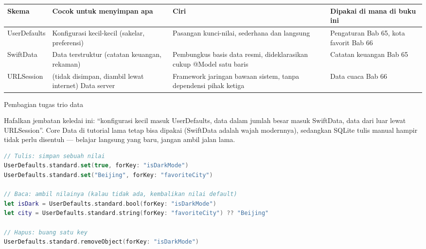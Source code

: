 


\begin{center}
\begin{tabularx}{\linewidth}{|X|X|X|X|}
\hline
\textbf{Skema} & \textbf{Cocok untuk menyimpan apa} & \textbf{Ciri} & \textbf{Dipakai di mana di buku ini} \tabularnewline
\hline
UserDefaults & Konfigurasi kecil-kecil (sakelar, preferensi) & Pasangan kunci-nilai, sederhana dan langsung & Pengaturan Bab 65, kota favorit Bab 66 \tabularnewline
SwiftData & Data terstruktur (catatan keuangan, rekaman) & Pembungkus basis data resmi, dideklarasikan cukup @Model satu baris & Catatan keuangan Bab 65 \tabularnewline
URLSession & (tidak disimpan, diambil lewat internet) Data server & Framework jaringan bawaan sistem, tanpa dependensi pihak ketiga & Data cuaca Bab 66 \tabularnewline
\hline
\end{tabularx}
\end{center}

\begin{center}\small\color{gray}Pembagian tugas trio data\end{center}

Hafalkan jembatan keledai ini: “konfigurasi kecil masuk UserDefaults, data dalam jumlah besar masuk SwiftData, data dari luar lewat URLSession”. Core Data di tutorial lama tetap bisa dipakai (SwiftData adalah wajah modernnya), sedangkan SQLite tulis manual hampir tidak perlu disentuh — belajar langsung yang baru, jangan ambil jalan lama.


\begin{lstlisting}[language=Swift]
// Tulis: simpan sebuah nilai
UserDefaults.standard.set(true, forKey: "isDarkMode")
UserDefaults.standard.set("Beijing", forKey: "favoriteCity")

// Baca: ambil nilainya (kalau tidak ada, kembalikan nilai default)
let isDark = UserDefaults.standard.bool(forKey: "isDarkMode")
let city = UserDefaults.standard.string(forKey: "favoriteCity") ?? "Beijing"

// Hapus: buang satu key
UserDefaults.standard.removeObject(forKey: "isDarkMode")
\end{lstlisting}

